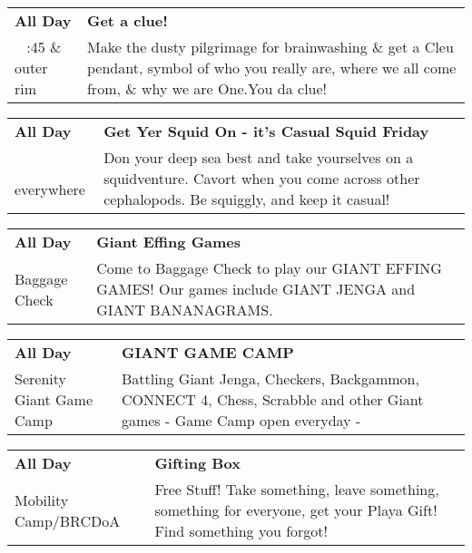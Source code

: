 \begin{tabular}{ p{1in} p{2.2in} }
    \textbf{All Day} & \textbf{Get a clue!} \\
    ~ \newline 3:45 \& outer rim & Make the dusty pilgrimage for brainwashing \& get a Cleu pendant, symbol of who you really are, where we all come from, \& why we are One.You da clue! \\
    \hline 
\end{tabular}
    
\begin{tabular}{ p{1in} p{2.2in} }
    \textbf{All Day} & \textbf{Get Yer Squid On - it's Casual Squid Friday} \\
    ~ \newline everywhere & Don your deep sea best and take yourselves on a squidventure. Cavort when you come across other cephalopods. Be squiggly, and keep it casual! \\
    \hline 
\end{tabular}
    
\begin{tabular}{ p{1in} p{2.2in} }
    \textbf{All Day} & \textbf{Giant Effing Games} \\
    Baggage Check \newline  & Come to Baggage Check to play our GIANT EFFING GAMES! Our games include GIANT JENGA and GIANT BANANAGRAMS. \\
    \hline 
\end{tabular}
    
\begin{tabular}{ p{1in} p{2.2in} }
    \textbf{All Day} & \textbf{GIANT GAME CAMP} \\
    Serenity Giant Game Camp \newline  & Battling Giant Jenga, Checkers, Backgammon, CONNECT 4, Chess, Scrabble and other Giant games - Game Camp open everyday - \\
    \hline 
\end{tabular}
    
\begin{tabular}{ p{1in} p{2.2in} }
    \textbf{All Day} & \textbf{Gifting Box} \\
    Mobility Camp/BRCDoA \newline  & Free Stuff! Take something, leave something, something for everyone, get your Playa Gift! Find something you forgot! \\
    \hline 
\end{tabular}
    
